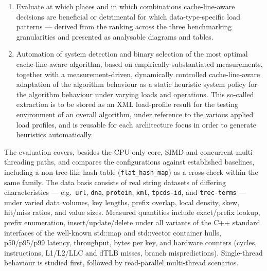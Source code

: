 \begin{enumerate}
  measured --- within the search-algorithm hull as well as the algorithm-category hull --- in each
  common interface function of its category, in isolation against load profiles; the algorithms of
  the category are evaluated comparatively against one another per interface function, in compliance
  with latency-aware best practices in database research), \emph{macro-benchmarking} (the
  individual interface operations of the search algorithm as a whole --- e.g.\ insert, point lookup,
  delete --- are measured through the interface functions of the algorithm category against sample
  loads or test subranges of the algorithm components), and \emph{whole-system benchmarking}
  (established YCSB-like load profiles and comparable frameworks over every recombination of the
  design components).
  \item Evaluate at which places and in which combinations cache-line-aware decisions are beneficial
  or detrimental for which data-type-specific load patterns --- derived from the ranking across the
  three benchmarking granularities and presented as analysable diagrams and tables.
  \item Automation of system detection and binary selection of the most optimal cache-line-aware
  algorithm, based on empirically substantiated measurements, together with a measurement-driven,
  dynamically controlled cache-line-aware adaptation of the algorithm behaviour as a static
  heuristic system policy for the algorithm behaviour under varying loads and operations. This
  so-called extraction is to be stored as an XML load-profile result for the testing environment of
  an overall algorithm, under reference to the various applied load profiles, and is reusable for
  each architecture focus in order to generate heuristics automatically.
\end{enumerate}

The evaluation covers, besides the CPU-only core, SIMD and concurrent multi-threading paths, and
compares the configurations against established baselines, including a non-tree-like hash table
(\texttt{flat\_hash\_map}) as a cross-check within the same family. The data basis consists of real
string datasets of differing characteristics --- e.g.\ \texttt{url}, \texttt{dna}, \texttt{protein},
\texttt{xml}, \texttt{tpcds-id}, and \texttt{trec-terms} --- under varied data volumes, key lengths,
prefix overlap, local density, skew, hit/miss ratios, and value sizes. Measured quantities include
exact/prefix lookup, prefix enumeration, insert/update/delete under all variants of the C++
standard interfaces of the well-known std::map and std::vector container hulls, p50/p95/p99
latency, throughput, bytes per key, and hardware counters (cycles, instructions, L1/L2/LLC and dTLB
misses, branch mispredictions). Single-thread behaviour is studied first, followed by read-parallel multi-thread
scenarios.

